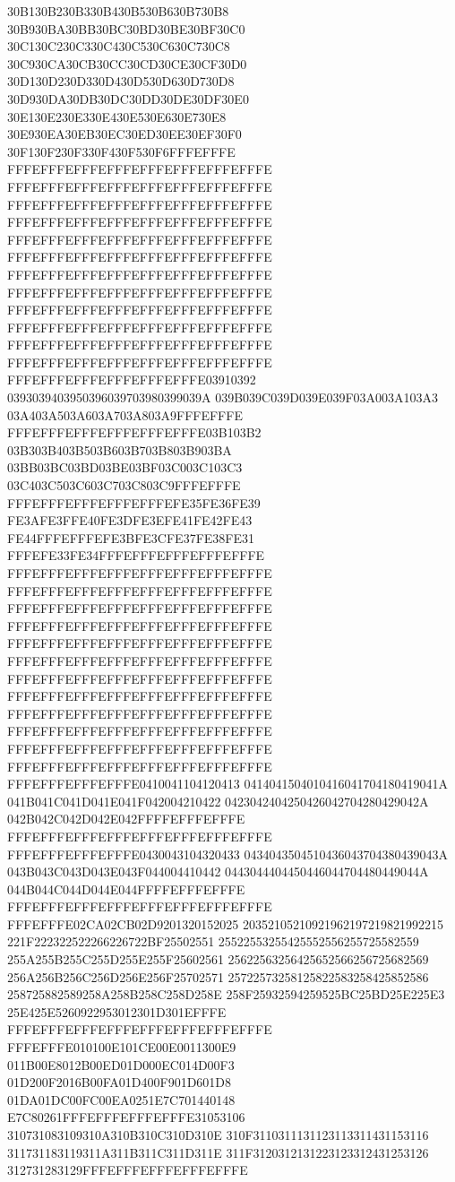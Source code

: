 30B130B230B330B430B530B630B730B8
30B930BA30BB30BC30BD30BE30BF30C0
30C130C230C330C430C530C630C730C8
30C930CA30CB30CC30CD30CE30CF30D0
30D130D230D330D430D530D630D730D8
30D930DA30DB30DC30DD30DE30DF30E0
30E130E230E330E430E530E630E730E8
30E930EA30EB30EC30ED30EE30EF30F0
30F130F230F330F430F530F6FFFEFFFE
FFFEFFFEFFFEFFFEFFFEFFFEFFFEFFFE
FFFEFFFEFFFEFFFEFFFEFFFEFFFEFFFE
FFFEFFFEFFFEFFFEFFFEFFFEFFFEFFFE
FFFEFFFEFFFEFFFEFFFEFFFEFFFEFFFE
FFFEFFFEFFFEFFFEFFFEFFFEFFFEFFFE
FFFEFFFEFFFEFFFEFFFEFFFEFFFEFFFE
FFFEFFFEFFFEFFFEFFFEFFFEFFFEFFFE
FFFEFFFEFFFEFFFEFFFEFFFEFFFEFFFE
FFFEFFFEFFFEFFFEFFFEFFFEFFFEFFFE
FFFEFFFEFFFEFFFEFFFEFFFEFFFEFFFE
FFFEFFFEFFFEFFFEFFFEFFFEFFFEFFFE
FFFEFFFEFFFEFFFEFFFEFFFEFFFEFFFE
FFFEFFFEFFFEFFFEFFFEFFFE03910392
0393039403950396039703980399039A
039B039C039D039E039F03A003A103A3
03A403A503A603A703A803A9FFFEFFFE
FFFEFFFEFFFEFFFEFFFEFFFE03B103B2
03B303B403B503B603B703B803B903BA
03BB03BC03BD03BE03BF03C003C103C3
03C403C503C603C703C803C9FFFEFFFE
FFFEFFFEFFFEFFFEFFFEFE35FE36FE39
FE3AFE3FFE40FE3DFE3EFE41FE42FE43
FE44FFFEFFFEFE3BFE3CFE37FE38FE31
FFFEFE33FE34FFFEFFFEFFFEFFFEFFFE
FFFEFFFEFFFEFFFEFFFEFFFEFFFEFFFE
FFFEFFFEFFFEFFFEFFFEFFFEFFFEFFFE
FFFEFFFEFFFEFFFEFFFEFFFEFFFEFFFE
FFFEFFFEFFFEFFFEFFFEFFFEFFFEFFFE
FFFEFFFEFFFEFFFEFFFEFFFEFFFEFFFE
FFFEFFFEFFFEFFFEFFFEFFFEFFFEFFFE
FFFEFFFEFFFEFFFEFFFEFFFEFFFEFFFE
FFFEFFFEFFFEFFFEFFFEFFFEFFFEFFFE
FFFEFFFEFFFEFFFEFFFEFFFEFFFEFFFE
FFFEFFFEFFFEFFFEFFFEFFFEFFFEFFFE
FFFEFFFEFFFEFFFEFFFEFFFEFFFEFFFE
FFFEFFFEFFFEFFFEFFFEFFFEFFFEFFFE
FFFEFFFEFFFEFFFE0410041104120413
0414041504010416041704180419041A
041B041C041D041E041F042004210422
0423042404250426042704280429042A
042B042C042D042E042FFFFEFFFEFFFE
FFFEFFFEFFFEFFFEFFFEFFFEFFFEFFFE
FFFEFFFEFFFEFFFE0430043104320433
0434043504510436043704380439043A
043B043C043D043E043F044004410442
0443044404450446044704480449044A
044B044C044D044E044FFFFEFFFEFFFE
FFFEFFFEFFFEFFFEFFFEFFFEFFFEFFFE
FFFEFFFE02CA02CB02D9201320152025
20352105210921962197219821992215
221F222322522266226722BF25502551
25522553255425552556255725582559
255A255B255C255D255E255F25602561
25622563256425652566256725682569
256A256B256C256D256E256F25702571
25722573258125822583258425852586
258725882589258A258B258C258D258E
258F25932594259525BC25BD25E225E3
25E425E5260922953012301D301EFFFE
FFFEFFFEFFFEFFFEFFFEFFFEFFFEFFFE
FFFEFFFE010100E101CE00E0011300E9
011B00E8012B00ED01D000EC014D00F3
01D200F2016B00FA01D400F901D601D8
01DA01DC00FC00EA0251E7C701440148
E7C80261FFFEFFFEFFFEFFFE31053106
310731083109310A310B310C310D310E
310F3110311131123113311431153116
311731183119311A311B311C311D311E
311F3120312131223123312431253126
312731283129FFFEFFFEFFFEFFFEFFFE
